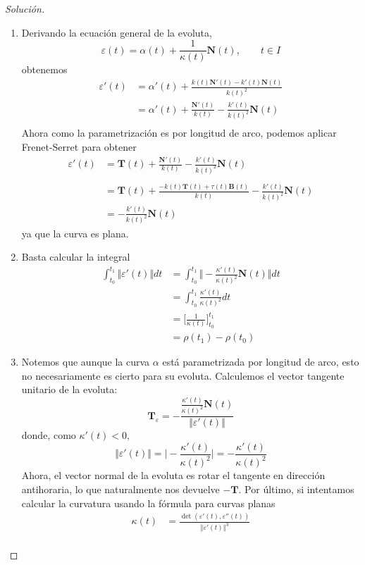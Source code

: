 \documentclass[spanish]{book}
\theoremstyle{definition}
\begin{document}
\begin{proof}[Solución]
	\begin{enumerate}
		\item Derivando la ecuación general de la evoluta,
		\[\varepsilon(t)=\alpha(t)+\frac{1}{\kappa(t)}\mathbf{N}(t),\qquad t\in I\]
		obtenemos
		\begin{align*}
			\varepsilon'(t)&=\alpha'(t)+\frac{k(t)\mathbf{N}'(t)-k'(t)\mathbf{N}(t)}{k(t)^2}\\
			&=\alpha'(t)+\frac{\mathbf{N}'(t)}{k(t)}-\frac{k'(t)}{k(t)^2}\mathbf{N}(t)\\
		\end{align*}
		Ahora como la parametrización es por longitud de arco, podemos aplicar Frenet-Serret para obtener
		\begin{align*}
			\varepsilon'(t)&=\mathbf{T}(t)+\frac{\mathbf{N}'(t)}{k(t)}-\frac{k'(t)}{k(t)^2}\mathbf{N}(t)\\\\
			&=\mathbf{T}(t)+\frac{-k(t)\mathbf{T}(t)+\tau(t)\mathbf{B}(t)}{k(t)}-\frac{k'(t)}{k(t)^2}\mathbf{N}(t)\\
			&=-\frac{k'(t)}{k(t)^2}\mathbf{N}(t)
		\end{align*}
		ya que la curva es plana.
		\item Basta calcular la integral
		\begin{align*}
			\int_{t_0}^{t_1}\Vert\varepsilon'(t)\Vert dt&=\int_{t_0}^{t_1}\Big\Vert-\frac{\kappa'(t)}{\kappa(t)^2}\mathbf{N}(t)\Big\Vert dt\\
			&=\int_{t_0}^{t_1}\frac{\kappa'(t)}{\kappa(t)^2} dt\\
			&=\Big[\frac{1}{\kappa(t)}\Big]_{t_0}^{t_1}\\
			&=\rho(t_1)-\rho(t_0)
		\end{align*}
		\item Notemos que aunque la curva $\alpha$ está parametrizada por longitud de arco, esto no necesariamente es cierto para su evoluta. Calculemos el vector tangente unitario de la evoluta:
		\[\mathbf{T}_\varepsilon=-\frac{\frac{\kappa'(t)}{\kappa(t)^2}\mathbf{N}(t)}{\Vert\varepsilon'(t)\Vert}\]
		donde, como $\kappa'(t)<0$,
		\[\Vert\varepsilon'(t)\Vert=\Big|-\frac{\kappa'(t)}{\kappa(t)^2}\Big|=-\frac{\kappa'(t)}{\kappa(t)^2}\]
		Ahora, el vector normal de la evoluta es rotar el tangente en dirección antihoraria, lo que naturalmente nos devuelve $-\mathbf{T}$.
		Por último, si intentamos calcular la curvatura usando la fórmula para curvas planas
		\begin{align*}
			\kappa(t)&=\frac{\det{(\varepsilon'(t),\varepsilon''(t))}}{\Vert \varepsilon'(t)\Vert^3}\\

\end{align*}
\end{enumerate}
\end{proof}
\end{document}

